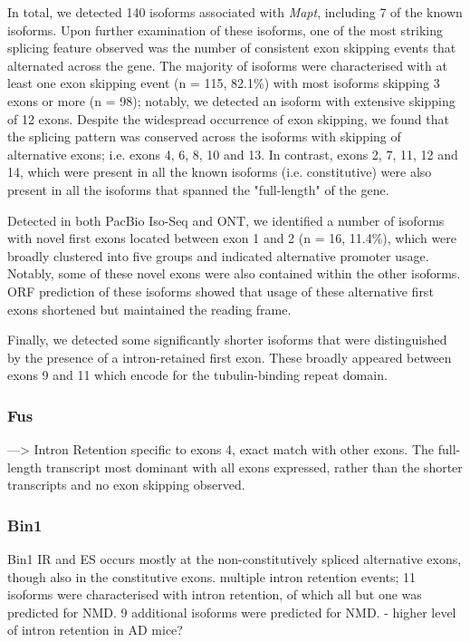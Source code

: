 In total, we detected 140 isoforms associated with \textit{Mapt}, including 7 of the known isoforms. Upon further examination of these isoforms, one of the most striking splicing feature observed was the number of consistent exon skipping events that alternated across the gene. The majority of isoforms were characterised with at least one exon skipping event (n = 115, 82.1\%) with most isoforms skipping 3 exons or more (n = 98); notably, we detected an isoform with extensive skipping of 12 exons. Despite the widespread occurrence of exon skipping, we found that the splicing pattern was conserved across the isoforms with skipping of alternative exons; i.e. exons 4, 6, 8, 10 and 13. In contrast, exons 2, 7, 11, 12 and 14, which were present in all the known isoforms (i.e. constitutive) were also present in all the isoforms that spanned the "full-length" of the gene. 

Detected in both PacBio Iso-Seq and ONT, we identified a number of isoforms with novel first exons located between exon 1 and 2 (n = 16, 11.4\%), which were broadly clustered into five groups and indicated alternative promoter usage. Notably, some of these novel exons were also contained within the other isoforms. ORF prediction of these isoforms showed that usage of these alternative first exons shortened but maintained the reading frame. 

Finally, we detected some significantly shorter isoforms that were distinguished by the presence of a intron-retained first exon. These broadly appeared between exons 9 and 11 which encode for the tubulin-binding repeat domain. 

\subsubsection{Fus}
---> Intron Retention specific to exons 4, exact match with other exons. The full-length transcript most dominant with all exons expressed, rather than the shorter transcripts and no exon skipping observed. 

\subsubsection{Bin1}
Bin1 IR and ES occurs mostly at the non-constitutively spliced alternative exons, though also in the constitutive exons. 
multiple intron retention events; 11 isoforms were characterised with intron retention, of which all but one was predicted for NMD. 9 additional isoforms were predicted for NMD. - higher level of intron retention in AD mice?

